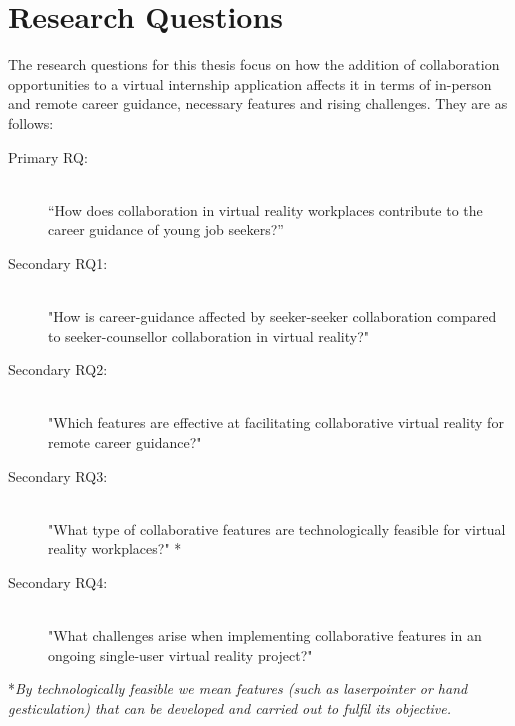 \section{Research Questions}
The research questions for this thesis focus on how the addition of collaboration opportunities to a virtual internship application affects it in terms of in-person and remote career guidance, necessary features and rising challenges. They are as follows:
\label{RQ}
\begin{description}
    \item [Primary RQ:]\hfill \\
    “How does collaboration in virtual reality workplaces contribute to the career guidance of young job seekers?” 
    \item [Secondary RQ1:]\hfill \\
    "How is career-guidance affected by seeker-seeker collaboration compared to seeker-counsellor collaboration in virtual reality?"
    \item [Secondary RQ2:]\hfill \\
    "Which features are effective at facilitating collaborative virtual reality for remote career guidance?"
    \item [Secondary RQ3:]\hfill \\
    "What type of collaborative features are technologically feasible for virtual reality workplaces?" *
    \item  [Secondary RQ4:]\hfill \\
    "What challenges arise when implementing collaborative features in an ongoing single-user virtual reality project?"
    
\end{description}

\vspace{2cm}
*\textit{By technologically feasible we mean features (such as laserpointer or hand gesticulation) that can be developed and carried out to fulfil its objective. }


\cleardoublepage
